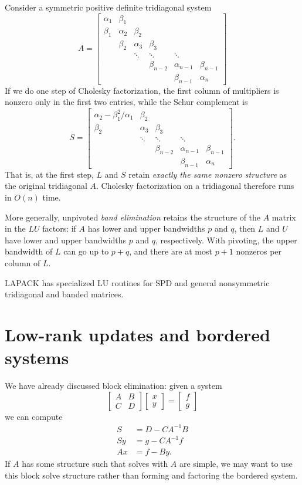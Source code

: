 \documentclass[12pt, leqno]{article} %
\begin{document}
Consider a symmetric positive definite tridiagonal system
\[
  A = \begin{bmatrix}
  \alpha_1 & \beta_1 \\
  \beta_1 & \alpha_2 & \beta_2 \\
  & \beta_2 & \alpha_3 & \beta_3 \\
  & & \ddots & \ddots & \ddots \\
  & & & \beta_{n-2} & \alpha_{n-1} & \beta_{n-1} \\
  & & & & \beta_{n-1} & \alpha_n
  \end{bmatrix}
\]
If we do one step of Cholesky factorization, the first column of
multipliers is nonzero only in the first two entries,
while the Schur complement is
\[
  S = \begin{bmatrix}
  \alpha_2-\beta_1^2/\alpha_1 & \beta_2 \\
  \beta_2 & \alpha_3 & \beta_3 \\
  & \ddots & \ddots & \ddots \\
  & & \beta_{n-2} & \alpha_{n-1} & \beta_{n-1} \\
  & & & \beta_{n-1} & \alpha_n
  \end{bmatrix}.
\]
That is, at the first step, $L$ and $S$ retain {\em exactly the same
nonzero structure} as the original tridiagonal $A$.  Cholesky
factorization on a tridiagonal therefore runs in $O(n)$ time.

More generally, unpivoted {\em band elimination} retains the structure
of the $A$ matrix in the $LU$ factors: if $A$ has lower and upper
bandwidths $p$ and $q$, then $L$ and $U$ have lower and upper
bandwidths $p$ and $q$, respectively.  With pivoting, the upper
bandwidth of $L$ can go up to $p+q$, and there are at most
$p+1$ nonzeros per column of $L$.

LAPACK has specialized LU routines for SPD and general nonsymmetric
tridiagonal and banded matrices.

\section{Low-rank updates and bordered systems}

We have already discussed block elimination: given a system
\[
  \begin{bmatrix} A & B \\ C & D \end{bmatrix}
  \begin{bmatrix} x \\ y \end{bmatrix} =
  \begin{bmatrix} f \\ g \end{bmatrix}
\]
we can compute
\begin{align*}
  S &= D-C A^{-1} B \\
  S y &= g-C A^{-1} f \\
  A x &= f-By.
\end{align*}
If $A$ has some structure such that solves with $A$ are simple,
we may want to use this block solve structure rather than
forming and factoring the bordered system.
\end{document}
